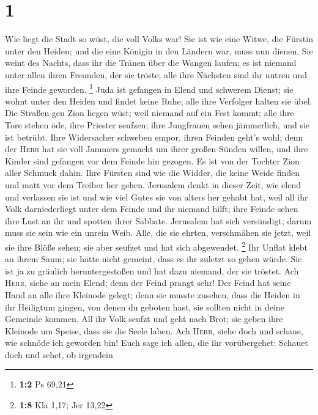 \hypertarget{section}{%
\section{1}\label{section}}

 Wie liegt die Stadt so wüst, die voll Volks war! Sie ist
wie eine Witwe, die Fürstin unter den Heiden; und die eine Königin in
den Ländern war, muss nun dienen.  Sie weint des Nachts,
dass ihr die Tränen über die Wangen laufen; es ist niemand unter allen
ihren Freunden, der sie tröste; alle ihre Nächsten sind ihr untreu und
ihre Feinde geworden. \footnote{\textbf{1:2} Ps 69,21} 
Juda ist gefangen in Elend und schwerem Dienst; sie wohnt unter den
Heiden und findet keine Ruhe; alle ihre Verfolger halten sie übel.
 Die Straßen gen Zion liegen wüst; weil niemand auf ein
Fest kommt; alle ihre Tore stehen öde, ihre Priester seufzen; ihre
Jungfrauen sehen jämmerlich, und sie ist betrübt.  Ihre
Widersacher schweben empor, ihren Feinden geht's wohl; denn der
\textsc{Herr} hat sie voll Jammers gemacht um ihrer großen Sünden
willen, und ihre Kinder sind gefangen vor dem Feinde hin gezogen.
 Es ist von der Tochter Zion aller Schmuck dahin. Ihre
Fürsten sind wie die Widder, die keine Weide finden und matt vor dem
Treiber her gehen.  Jerusalem denkt in dieser Zeit, wie
elend und verlassen sie ist und wie viel Gutes sie von alters her gehabt
hat, weil all ihr Volk darniederliegt unter dem Feinde und ihr niemand
hilft; ihre Feinde sehen ihre Lust an ihr und spotten ihrer Sabbate.
 Jerusalem hat sich versündigt; darum muss sie sein wie
ein unrein Weib. Alle, die sie ehrten, verschmähen sie jetzt, weil sie
ihre Blöße sehen; sie aber seufzet und hat sich abgewendet. \footnote{\textbf{1:8}
  Kla 1,17; Jer 13,22}  Ihr Unflat klebt an ihrem Saum;
sie hätte nicht gemeint, dass es ihr zuletzt so gehen würde. Sie ist ja
zu gräulich heruntergestoßen und hat dazu niemand, der sie tröstet. Ach
\textsc{Herr}, siehe an mein Elend; denn der Feind prangt sehr!
 Der Feind hat seine Hand an alle ihre Kleinode gelegt;
denn sie musste zusehen, dass die Heiden in ihr Heiligtum gingen, von
denen du geboten hast, sie sollten nicht in deine Gemeinde kommen.
 All ihr Volk seufzt und geht nach Brot; sie geben ihre
Kleinode um Speise, dass sie die Seele laben. Ach \textsc{Herr}, siehe
doch und schaue, wie schnöde ich geworden bin!  Euch sage
ich allen, die ihr vorübergehet: Schauet doch und sehet, ob irgendein

